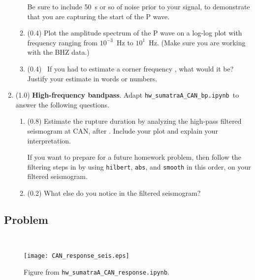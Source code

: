 \documentclass[11pt,titlepage,fleqn]{article}
\newcommand{\tfileresponse}{{\tt hw\_sumatraA\_CAN\_response.ipynb}}
\newcommand{\tfilebp}{{\tt hw\_sumatraA\_CAN\_bp.ipynb}}
\begin{document}
\begin{enumerate}
\begin{enumerate}
Be sure to include 50~s or so of noise prior to your signal, to demonstrate that you are capturing the start of the P wave.

\item (0.4) Plot the amplitude spectrum of the P wave on a log-log plot with frequency ranging from $10^{-3}$~Hz to $10^1$~Hz. (Make sure you are working with the BHZ data.)


\item (0.4) \ptag\ If you had to estimate a corner frequency \citep[][p.~267]{SteinWysession}, what would it be? Justify your estimate in words or numbers.
\end{enumerate}


\item (1.0) {\bf High-frequency bandpass}. Adapt \tfilebp\ to answer the following questions.
%
\begin{enumerate}
\item (0.8) Estimate the rupture duration by analyzing the high-pass filtered seismogram at CAN, after \citet{Ni2005}. Include your plot and explain your interpretation.

If you want to prepare for a future homework problem, then follow the filtering steps in \citet{Ni2005} by using \verb+hilbert+, \verb+abs+, and \verb+smooth+ in this order, on your filtered seismogram.

\item (0.2) What else do you notice in the filtered seismogram?
\end{enumerate}

\end{enumerate}


\pagebreak
\subsection*{Problem} \howmuchtime\




%

\begin{figure}
\hspace{-1cm}
\texttt{[image: CAN\_response\_seis.eps]}
\caption[]
{{
Figure from \tfileresponse.
}}
\label{fig:seis}
\end{figure}

\end{document}
